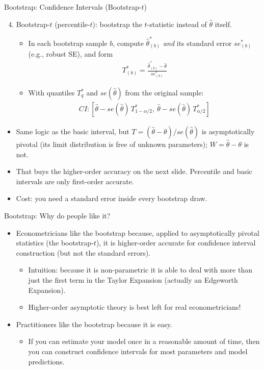 \documentclass[aspectratio=169,11pt]{beamer}
\begin{document}
\begin{frame}{Bootstrap: Confidence Intervals (Bootstrap-$t$)}
\small
\small
\begin{enumerate}
\setcounter{enumi}{3}
\item Bootstrap-$t$ (percentile-$t$): bootstrap the \alert{$t$-statistic} instead of $\hat{\theta}$ itself.
\begin{itemize}
\item In each bootstrap sample $b$, compute $\hat{\theta}^{*}_{(b)}$ \emph{and} its standard error $se^{*}_{(b)}$ (e.g., robust SE), and form
\begin{eqnarray*}
T^{*}_{(b)} = \frac{\hat{\theta}^{*}_{(b)} - \hat{\theta}}{se^{*}_{(b)}}
\end{eqnarray*}
\item With quantiles $T^{*}_{q}$ and $se(\hat{\theta})$ from the original sample:
\begin{eqnarray*}
CI: [\hat{\theta} - se(\hat{\theta})\, T^{*}_{1-\alpha/2},\ \hat{\theta} - se(\hat{\theta})\, T^{*}_{\alpha/2}]
\end{eqnarray*}
\end{itemize}
\end{enumerate}
\begin{itemize}
\item Same logic as the basic interval, but $T = (\hat{\theta}-\theta)/se(\hat{\theta})$ is \alert{asymptotically pivotal}
(its limit distribution is free of unknown parameters); $W = \hat{\theta}-\theta$ is not.
\item That buys the higher-order accuracy on the next slide. Percentile and basic intervals are only first-order accurate.
\item Cost: you need a standard error inside every bootstrap draw.
\end{itemize}
\end{frame}


\begin{frame}{Bootstrap: Why do people like it?}
\begin{itemize}
\item Econometricians like the bootstrap because, applied to asymptotically pivotal statistics (the bootstrap-$t$), it is \alert{higher-order accurate} for confidence interval construction (but not the standard errors).
\begin{itemize}
\item Intuition: because it is non-parametric it is able to deal with more than just the first term in the Taylor Expansion (actually an \alert{Edgeworth Expansion}).
\item Higher-order asymptotic theory is best left for real econometricians!
\end{itemize}
\item Practitioners like the bootstrap because it is easy.
\begin{itemize}
\item If you can estimate your model once in a reasonable amount of time, then you can construct confidence intervals for most parameters and model predictions.
\end{itemize}
\end{itemize}
\end{frame}
\end{document}
